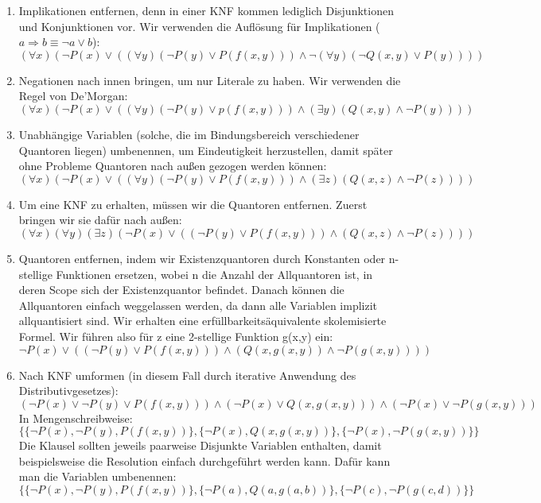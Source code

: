 \documentclass[a4paper,10pt]{article}
\begin{document}
\begin{enumerate}
    \item Implikationen entfernen, denn in einer KNF kommen lediglich Disjunktionen und Konjunktionen vor. Wir verwenden die Auflösung für Implikationen ($a \Rightarrow b \equiv \lnot a \lor b$):\\
    $(\forall x)(\lnot P(x) \lor ((\forall y)(\lnot P(y) \lor P(f(x,y))) \land \lnot (\forall y)(\lnot Q(x,y) \lor P(y))))$

    \item Negationen nach innen bringen, um nur Literale zu haben. Wir verwenden die Regel von De'Morgan:\\
    $(\forall x)(\lnot P(x) \lor ((\forall y)(\lnot P(y) \lor p(f(x,y))) \land (\exists y)(Q(x,y) \land \lnot P(y))))$

    \item Unabhängige Variablen (solche, die im Bindungsbereich verschiedener Quantoren liegen) umbenennen, um Eindeutigkeit herzustellen, damit später ohne Probleme Quantoren nach außen gezogen werden können:\\
    $(\forall x)(\lnot P(x) \lor ((\forall y)(\lnot P(y) \lor P(f(x,y))) \land (\exists z)(Q(x,z) \land \lnot P(z))))$

    \item Um eine KNF zu erhalten, müssen wir die Quantoren entfernen. Zuerst bringen wir sie dafür nach außen:\\
    $(\forall x)(\forall y)(\exists z)(\lnot P(x) \lor ((\lnot P(y) \lor P(f(x,y))) \land (Q(x,z) \land \lnot P(z))))$

    \item Quantoren entfernen, indem wir Existenzquantoren durch Konstanten oder n-stellige Funktionen ersetzen, wobei n die Anzahl der Allquantoren ist, in deren Scope sich der Existenzquantor befindet. Danach können die Allquantoren einfach weggelassen werden, da dann alle Variablen implizit allquantisiert sind. Wir erhalten eine erfüllbarkeitsäquivalente skolemisierte Formel. Wir führen also für z eine 2-stellige Funktion g(x,y) ein:\\
    $\lnot P(x) \lor ((\lnot P(y) \lor P(f(x,y))) \land (Q(x,g(x,y)) \land \lnot P(g(x,y))))$

    \item Nach KNF umformen (in diesem Fall durch iterative Anwendung des Distributivgesetzes):\\
    $(\lnot P(x) \lor \lnot P(y) \lor P(f(x,y))) \land (\lnot P(x) \lor Q(x,g(x,y))) \land (\lnot P(x) \lor \lnot P(g(x,y)))$\\
    In Mengenschreibweise:\\
    $\{\{\lnot P(x), \lnot P(y), P(f(x,y))\}, \{\lnot P(x),Q(x,g(x,y))\},\{\lnot P(x),\lnot P(g(x,y))\}\}$ \\
    Die Klausel sollten jeweils paarweise Disjunkte Variablen enthalten, damit beispielsweise die Resolution einfach durchgeführt werden kann. Dafür kann man die Variablen umbenennen:\\
    $\{\{\lnot P(x), \lnot P(y), P(f(x,y))\}, \{\lnot P(a),Q(a,g(a,b))\},\{\lnot P(c),\lnot P(g(c,d))\}\}$
\end{enumerate}
\end{document}
